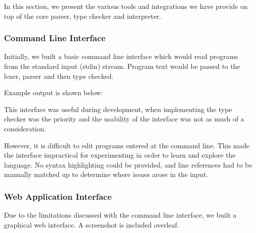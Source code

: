 \documentclass[a4paper,openany,12pt]{book}
\begin{document}
In this section, we present the various tools and integrations we have provide on top of the core parser, type checker
and interpreter.

\subsubsection{Command Line Interface}

Initially, we built a basic command line interface which would read programs from the standard input (stdin) stream.
Program text would be passed to the lexer, parser and then type checked.

Example output is shown below:


This interface was useful during development, when implementing the type checker was the priority and the usability
of the interface was not as much of a consideration.

However, it is difficult to edit programs entered at the command line.
This made the interface impractical for experimenting in order to learn and explore the language.
No syntax highlighting could be provided, and line references had to be manually matched up to determine where
issues arose in the input.

\subsubsection{Web Application Interface}

Due to the limitations discussed with the command line interface, we built a graphical web interface.
A screenshot is included overleaf.
\end{document}
